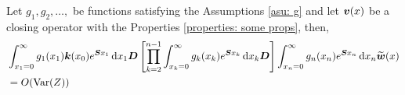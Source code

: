 \begin{cor}\label{cor: amammme}
	Let \(g_1, g_2, \dots,\) be functions satisfying the Assumptions \ref{asu: g} and let \({\boldsymbol v}(x)\) be a closing operator with the Properties \ref{properties: some props}, then,
	\begin{align}
		&\int_{x_1=0}^\infty g_1(x_1) \boldsymbol k(x_0) e^{\boldsymbol{S}x_1}\, \mathrm{d} x_1\boldsymbol D 
            	\left[\prod_{k=2}^{n-1}\int_{x_k=0}^\infty g_k(x_k) e^{\boldsymbol{S}x_k} \, \mathrm{d} x_k \boldsymbol D\right] \int_{x_n=0}^\infty g_{n}(x_n) e^{\boldsymbol{S}x_n} \, \mathrm{d} x_n \widetilde{\boldsymbol w}(x) \nonumber 
		\\&= O(\mathrm{Var}(Z)) \label{eqn :mmmm2}
	\end{align}
\end{cor}
